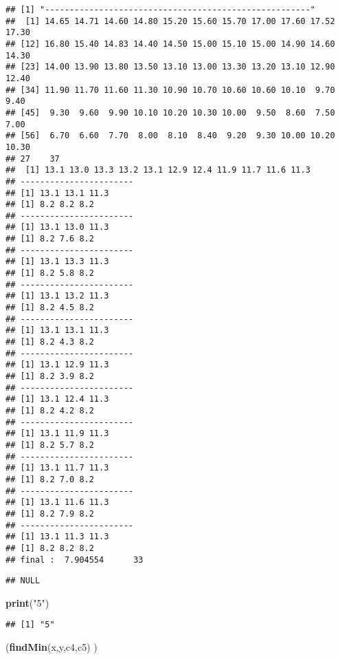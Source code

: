 \documentclass[]{article}
\newenvironment{Shaded}{\begin{snugshade}}{\end{snugshade}}
\newcommand{\KeywordTok}[1]{\textcolor[rgb]{0.13,0.29,0.53}{\textbf{#1}}}
\newcommand{\StringTok}[1]{\textcolor[rgb]{0.31,0.60,0.02}{#1}}
\newcommand{\NormalTok}[1]{#1}
\begin{document}
\begin{verbatim}
## [1] "------------------------------------------------------"
##  [1] 14.65 14.71 14.60 14.80 15.20 15.60 15.70 17.00 17.60 17.52 17.30
## [12] 16.80 15.40 14.83 14.40 14.50 15.00 15.10 15.00 14.90 14.60 14.30
## [23] 14.00 13.90 13.80 13.50 13.10 13.00 13.30 13.20 13.10 12.90 12.40
## [34] 11.90 11.70 11.60 11.30 10.90 10.70 10.60 10.60 10.10  9.70  9.40
## [45]  9.30  9.60  9.90 10.10 10.20 10.30 10.00  9.50  8.60  7.50  7.00
## [56]  6.70  6.60  7.70  8.00  8.10  8.40  9.20  9.30 10.00 10.20 10.30
## 27    37 
##  [1] 13.1 13.0 13.3 13.2 13.1 12.9 12.4 11.9 11.7 11.6 11.3
## -----------------------
## [1] 13.1 13.1 11.3
## [1] 8.2 8.2 8.2
## -----------------------
## [1] 13.1 13.0 11.3
## [1] 8.2 7.6 8.2
## -----------------------
## [1] 13.1 13.3 11.3
## [1] 8.2 5.8 8.2
## -----------------------
## [1] 13.1 13.2 11.3
## [1] 8.2 4.5 8.2
## -----------------------
## [1] 13.1 13.1 11.3
## [1] 8.2 4.3 8.2
## -----------------------
## [1] 13.1 12.9 11.3
## [1] 8.2 3.9 8.2
## -----------------------
## [1] 13.1 12.4 11.3
## [1] 8.2 4.2 8.2
## -----------------------
## [1] 13.1 11.9 11.3
## [1] 8.2 5.7 8.2
## -----------------------
## [1] 13.1 11.7 11.3
## [1] 8.2 7.0 8.2
## -----------------------
## [1] 13.1 11.6 11.3
## [1] 8.2 7.9 8.2
## -----------------------
## [1] 13.1 11.3 11.3
## [1] 8.2 8.2 8.2
## final :  7.904554      33
\end{verbatim}

\begin{verbatim}
## NULL
\end{verbatim}

\begin{Shaded}
\begin{Highlighting}[]
\KeywordTok{print}\NormalTok{(}\StringTok{"5"}\NormalTok{)}
\end{Highlighting}
\end{Shaded}

\begin{verbatim}
## [1] "5"
\end{verbatim}

\begin{Shaded}
\begin{Highlighting}[]
\NormalTok{(}\KeywordTok{findMin}\NormalTok{(x,y,c4,c5) )}
\end{Highlighting}
\end{Shaded}
\end{document}
